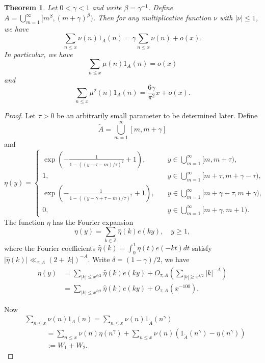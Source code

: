 \documentclass[a4paper,10pt]{amsart}
\newtheorem{theorem}{Theorem}[section]
\newcommand{\Z}{\mathbb Z} %
\begin{document}
\begin{theorem}
Let $0<\gamma<1$ and write $\beta=\gamma^{-1}$. 
Define $A=\bigcup_{m=1}^\infty [m^\beta, (m+\gamma)^\beta)$. 
Then for any multiplicative function $\nu$ with $|\nu|\leq 1$, we have
\[
\sum_{ n\leq x} \nu(n) 1_A(n) = \gamma \sum\limits_{n\leq x} \nu(n) 
+ \textit{o}(x).
\]
In particular, we have
\[
\sum_{ n\leq x} \mu(n) 1_A(n) = \textit{o}(x)
\]
and
\[
\sum_{ n\leq x} \mu^2(n) 1_A(n) = \frac{6\gamma}{\pi^2} x + \textit{o}(x).
\]
\end{theorem}

\begin{proof}
Let $\tau>0$ be an arbitrarily small parameter to be determined later. 
Define
\[
\widetilde{A}=\bigcup_{m=1}^\infty [m,m+\gamma]
\]
and
\[
\eta(y)=
\begin{cases}
\exp\left(-\frac{1}{1-\left((y-\tau-m)/\tau\right)^2}+1\right), 
\quad &y\in \bigcup_{m=1}^\infty [m,m+\tau),\\
1, \quad &y\in \bigcup_{m=1}^\infty [m+\tau,m+\gamma-\tau),\\
\exp\left(-\frac{1}{1-\left((y-\gamma+\tau-m)/\tau\right)^2}+1\right), 
\quad &y\in \bigcup_{m=1}^\infty [m+\gamma-\tau, m+\gamma),\\
0, \quad &y\in \bigcup_{m=1}^\infty [m+\gamma, m+1).
\end{cases}
\]
The function $\eta$ has the Fourier expansion
\[
\eta(y) = \sum_{k\in \Z} \widehat{\eta}(k) e(ky), \quad y\geq 1,
\]
where the Fourier coefficients 
$\widehat{\eta}(k)=\int_0^1 \eta(t)e(-kt) dt$ 
satisfy $|\widehat{\eta}(k)|\ll_{\tau,A} (2+|k|)^{-A}$. 
Write $\delta=(1-\gamma)/2$, we have
\begin{align*}
\eta(y) &= \sum_{|k|\leq x^{\delta/2}} \widehat{\eta}(k) e(ky)+ 
    \textit{O}_{\tau,A}\left(\sum_{|k|\geq x^{\delta/2}}|k|^{-A}\right)\\
&= \sum_{|k|\leq x^{\delta/2}} \widehat{\eta}(k) e(ky)
    + \textit{O}_{\tau,A}\left(x^{-100}\right).
\end{align*}

Now
\begin{align*}
&\sum_{ n\leq x} \nu(n) 1_A(n) = \sum_{  n\leq x} \nu(n) 
    1_{\widetilde{A}}(n^\gamma)\\
&\quad \quad \quad  = \sum_{  n\leq x} \nu(n) \eta(n^\gamma) 
    +\sum_{  n\leq x} \nu(n) \left(1_{\widetilde{A}}(n^\gamma)
    -\eta(n^\gamma)\right)\\
&\quad \quad \quad  := W_1+W_2.
\end{align*}


\end{proof}
\end{document}
